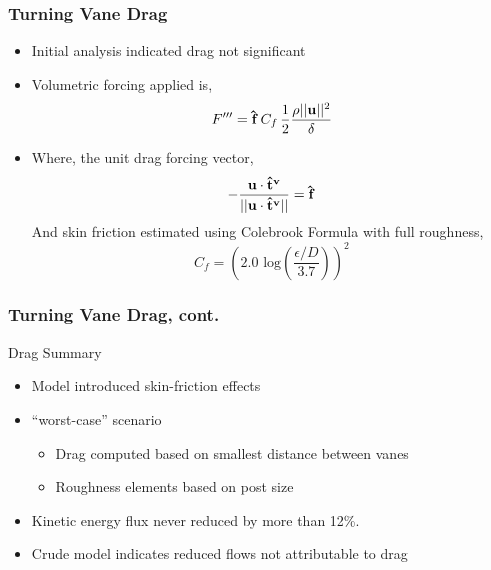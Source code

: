 \documentclass[mathserif]{beamer}
\begin{document}
%
%
%
\begin{frame}
 \frametitle{Turning Vane Drag}
 \begin{block}{}
   \begin{itemize}
   \item Initial analysis indicated drag not significant%
   \item Volumetric forcing applied is, 
     \begin{equation}
       F''' = {\bf \hat f} \, C_f \, \frac{1}{2} \frac{\rho || {\bf u} ||^2}{\delta}
     \end{equation}
   \item Where, the unit drag forcing vector,
     \begin{equation}
       - \frac{{\bf u} \cdot {\bf \hat t^v}}{|| {\bf u} \cdot {\bf \hat t^v}
         ||} = {\bf \hat f}
     \end{equation}
     And skin friction estimated using Colebrook Formula with full roughness, 
     \begin{equation}
       C_f = \left(2.0 \text{ log}\left(\frac{\epsilon/D}{3.7}\right)\right)^2
     \end{equation}
   \end{itemize}
 \end{block}
\end{frame}


\begin{frame}
  \frametitle{Turning Vane Drag, cont.}
  \begin{block}{Drag Summary}
    \begin{itemize}
    \item Model introduced skin-friction effects
    \item ``worst-case'' scenario
      \begin{itemize}
      \item Drag computed based on smallest distance between vanes
      \item Roughness elements based on post size
      \end{itemize}
    \item Kinetic energy flux never reduced by more than 12\%.
    \item Crude model indicates reduced flows not attributable to drag
    \end{itemize}
  \end{block}
  
\end{frame}
\end{document}
